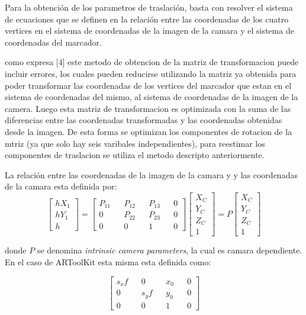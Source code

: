 \documentclass[runningheads]{llncs}
\begin{document}
Para la obtención de los parametros de traslación, basta con resolver el sistema de ecuaciones que se definen en la relación entre las coordenadas de los cuatro vertices en el sistema de coordenadas de la imagen de la camara y el sistema de coordenadas del marcador.

como expresa [4] este metodo de obtencion de la matriz de transformacion puede incluir errores, los cuales pueden reducirse utilizando la matriz ya obtenida para poder transformar las coordenadas de los vertices del marcador que estan en el sistema de coordenadas del mismo, al sistema de coordenadas de la imagen de la camera. Luego esta matriz de transformacion es optimizada  con la suma de las diferencias entre las coordenadas transformadas y las coordenadas obtenidas desde la imagen. De esta forma se optimizan los componentes de rotacion de la mtriz (ya que solo hay seis varibales independientes), para reestimar los componentes de traslacion se utiliza el metodo descripto anteriormente. 



La relación entre las coordenadas de la imagen de la camara y y las coordenadas de la camara esta definida por:
\[
\begin{bmatrix}
hX_{1} \\
hY_{1} \\
h 
\end{bmatrix} =
\begin{bmatrix}
P_{11} && P_{12} && P_{13} && 0\\ 
0 && P_{22} && P_{23} && 0\\
0 && 0 && 1 && 0
\end{bmatrix} 
\begin{bmatrix}
X_{C} \\
Y_{C} \\
Z_{C} \\
1
\end{bmatrix} = P \begin{bmatrix}
X_{C} \\
Y_{C} \\
Z_{C} \\
1
\end{bmatrix}
\]

donde $P$ se denomina \textit{intrinsic camera parameters}, la cual es camara dependiente. En el caso de ARToolKit esta misma esta definida como:

\[
\begin{bmatrix}
s_{x}f && 0 && x_{0} && 0\\ 
0 && s_{y}f && y_{0} && 0\\
0 && 0 && 1 && 0
\end{bmatrix} 
\]
\end{document}
